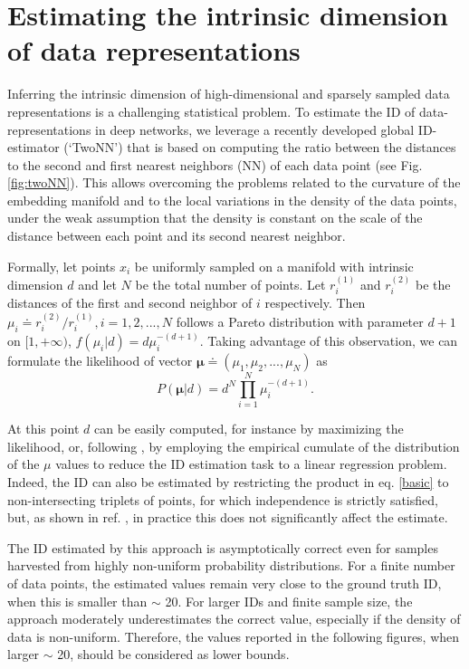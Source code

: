 \documentclass{article}
\begin{document}
\section{Estimating the intrinsic dimension of data representations}

Inferring the intrinsic dimension of high-dimensional and sparsely sampled data representations is a challenging statistical problem. To estimate the ID of data-representations in deep networks, we leverage a recently developed global ID-estimator (`TwoNN') that is based on computing the ratio between the distances to the second and first nearest neighbors (NN) of each data point \cite{facco2017estimating} (see Fig. \ref{fig:twoNN}). This allows overcoming the problems related to the curvature of the embedding manifold and to the local variations in the density of the data points, under the weak assumption that the density is constant on the scale of the distance between each point and its second nearest neighbor. 

Formally, let points $x_i$ be uniformly sampled on a manifold with intrinsic dimension $d$ and let $N$ be the total number of points. Let {$r_{i}^{(1)}$} and {$r_{i}^{(2)}$} be the distances of the first and second neighbor of $i$ respectively. Then {$\mu_i \doteq r_{i}^{(2)}/r_{i}^{(1)}, i=1,2,...,N$} follows a Pareto distribution with parameter $d+1$ on $[1, + \infty)$, $ f(\mu_i | d)=d \mu_i^{-(d+1)}$. Taking advantage of this observation, we can formulate the likelihood of vector $\pmb{\mu} \doteq (\mu_1, \mu_2,...,\mu_N)$ as
\begin{equation}
P(\pmb{\mu}|d)=d^N\prod_{i=1}^N \mu_i^{-(d+1)}.
\label{basic}
\end{equation}

At this point $d$ can be easily computed, for instance by maximizing the likelihood, or, following \cite{facco2017estimating}, by employing the empirical cumulate of the distribution of the $\mu$ values to reduce the ID estimation task to a linear regression problem. Indeed, the ID can also be estimated by restricting the product in eq. \ref{basic} to non-intersecting triplets of points, for which independence is strictly satisfied, but, as shown in ref. \cite{facco2017estimating}, in practice this does not significantly affect the estimate.

The ID estimated by this approach is asymptotically correct even for samples harvested from highly non-uniform probability distributions. For a finite number of data points, the estimated values remain very close to the ground truth ID, when this is smaller than $\sim$ 20. 
For larger IDs and finite sample size, the approach moderately underestimates the correct value, especially if the density of data is non-uniform. Therefore, the values reported in the following figures, when larger $\sim$ 20, should be considered as lower bounds. 
\end{document}
